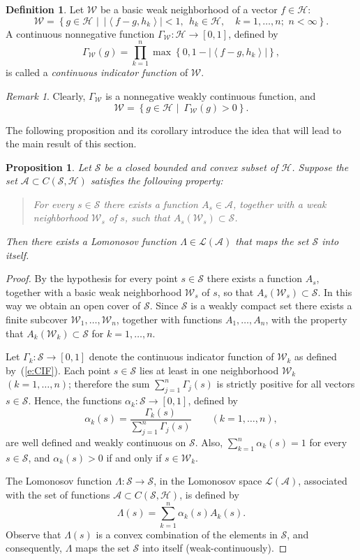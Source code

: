 \documentclass{tran-l}
\newtheorem{prop}[thm]{Proposition}
\theoremstyle{definition}
\newtheorem{defn}[thm]{Definition}
\theoremstyle{remark}
\newtheorem{rem}[thm]{Remark}
\numberwithin{equation}{subsection}
\newcommand{\To}{\longrightarrow}
\newcommand{\h}{\mathcal{H}}
\newcommand{\s}{\mathcal{S}}
\newcommand{\A}{\mathcal{A}}
\newcommand{\W}{\mathcal{W}}
\newcommand{\Lom}{\mathcal{L}}
\newcommand{\abs}[1]{\left\vert#1\right\vert}
\newcommand{\set}[1]{\left\{#1\right\}}
\newcommand{\seq}[1]{\left<#1\right>}
\begin{document}
\begin{defn}
Let $\W$ be a basic weak neighborhood of a vector $f\in\h$:
\begin{equation}\label{e:WeakBase}
  \W=\set{g\in\h\,\,|\,\,\,\abs{\seq{f-g,h_k}} < 1, ~~ h_k\in\h,
  \quad k=1,\ldots,n; \,\, n < \infty}.
\end{equation}
A continuous nonnegative function $\Gamma_\W\colon\h\To[0,1]$, defined by
\begin{equation}\label{e:CIF}
  \Gamma_\W(g)= \prod_{k=1}^n \max\set{0,1-\abs{\seq{f-g,h_k}}},
\end{equation}
is called a \emph{continuous indicator function} of $\W$.
\end{defn}

\begin{rem}
Clearly, $\Gamma_\W$ is a nonnegative weakly continuous function, and
\[ \W = \set{g\in\h\,\,|\,\,\,\Gamma_\W(g)>0}. \]
\end{rem}

The following proposition and its corollary introduce the idea that will lead to the main result of this section.

\begin{prop} \label{p:wAPPROX}
Let $\s$ be a closed bounded and convex subset of $\h$. Suppose the set $\A\subset{C}(\s,\h)$ satisfies the following property:
\begin{quote}
{For every $s\in\s$ there exists a function $A_s\in\A$, together with a weak neighborhood $\W_s$ of $s$, such that $A_s(\W_s)\subset\s$.}
\end{quote}
Then there exists a Lomonosov function $\Lambda\in\Lom(\A)$ that maps the set $\s$ into itself.
\end{prop}

\begin{proof}
By the hypothesis for every point $s\in\s$ there exists a function $A_s$, together with a basic weak neighborhood $\W_s$ of $s$, so that $A_s(\W_s)\subset\s$. In this way we obtain an open cover of $\s$. Since $\s$ is a weakly compact set there exists a finite subcover $\W_1,\ldots,\W_n$, together with functions $A_1,\ldots,A_n$, with the property that $A_k(\W_k)\subset\s$ for $k=1,\ldots,n$.

Let $\Gamma_k\colon\s\To[0,1]$ denote the continuous indicator function of $\W_k$ as defined by~(\ref{e:CIF}). Each point $s\in\s$ lies at least in one neighborhood $\W_k$ $(k=1,\ldots,n)$; therefore the sum $\sum_{j=1}^n\Gamma_j(s)$ is strictly positive for all vectors $s\in\s$. Hence, the functions $\alpha_k\colon\s\To[0,1]$, defined by
\[ \alpha_k(s) = \frac{\Gamma_k(s)}{\sum_{j=1}^n \Gamma_j(s)}
   \quad\quad  (k=1,\ldots,n), \]
are well defined and weakly continuous on $\s$. Also, $\sum_{k=1}^n\alpha_k(s)=1$ for every $s\in\s$, and $\alpha_k(s)>0$ if and only if $s\in\W_k$.

The Lomonosov function $\Lambda\colon\s\To\s$, in the Lomonosov space $\Lom(\A)$, associated with the set of functions $\A\subset{C}(\s,\h)$, is defined by
\[ \Lambda(s) = \sum_{k=1}^n \alpha_k(s) A_k(s). \]
Observe that $\Lambda(s)$ is a convex combination of the elements in $\s$, and consequently, $\Lambda$ maps the set $\s$ into itself (weak-continuously).
\end{proof}
\end{document}

